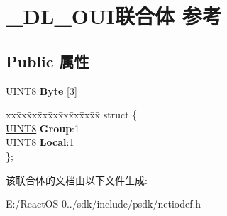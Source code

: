 \hypertarget{union___d_l___o_u_i}{}\section{\+\_\+\+D\+L\+\_\+\+O\+U\+I联合体 参考}
\label{union___d_l___o_u_i}
\subsection*{Public 属性}
\begin{DoxyCompactItemize}
\item 
\mbox{\label{union___d_l___o_u_i_adb4a362ac17801ed0ccf9400c6bd88d5}} 
\hyperlink{_processor_bind_8h_ab27e9918b538ce9d8ca692479b375b6a}{U\+I\+N\+T8} {\bfseries Byte} \mbox{[}3\mbox{]}
\item 
\mbox{\label{union___d_l___o_u_i_a52032f1153f2cef4e6d8e520c4057c73}} 
\begin{tabbing}
xx\=xx\=xx\=xx\=xx\=xx\=xx\=xx\=xx\=\kill
struct \{\\
\>\hyperlink{_processor_bind_8h_ab27e9918b538ce9d8ca692479b375b6a}{UINT8} {\bfseries Group}:1\\
\>\hyperlink{_processor_bind_8h_ab27e9918b538ce9d8ca692479b375b6a}{UINT8} {\bfseries Local}:1\\
\}; \\

\end{tabbing}\end{DoxyCompactItemize}


该联合体的文档由以下文件生成\+:\begin{DoxyCompactItemize}
\item 
E\+:/\+React\+O\+S-\/0../sdk/include/psdk/netiodef.\+h\end{DoxyCompactItemize}
